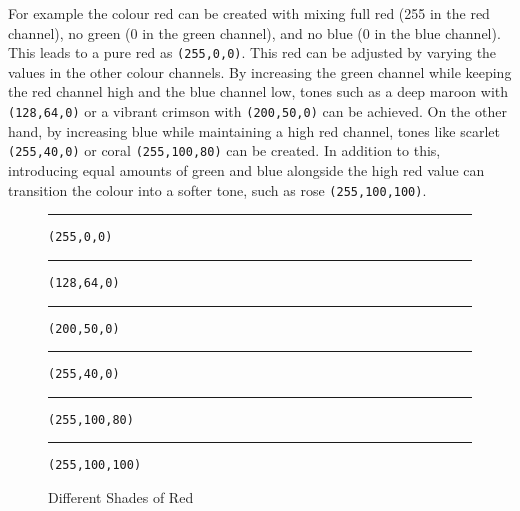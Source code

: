 \documentclass[../MasterThesis.tex]{subfiles}
\begin{document}
For example the colour red can be created with mixing full red (255 in the red channel), no green (0 in the green channel), and no blue (0 in the blue channel). This leads to a pure red as \texttt{(255,0,0)}.
This red can be adjusted by varying the values in the other colour channels. By increasing the green channel while keeping the red channel high and the blue channel low, tones such as a deep maroon with \texttt{(128,64,0)} or a vibrant crimson with \texttt{(200,50,0)} can be achieved. On the other hand, by increasing blue while maintaining a high red channel, tones like scarlet \texttt{(255,40,0)} or coral \texttt{(255,100,80)} can be created. In addition to this, introducing equal amounts of green and blue alongside the high red value can transition the colour into a softer tone, such as rose \texttt{(255,100,100)}.

\begin{figure}[h]
\centering
 \begin{minipage}{\textwidth}
	\centering
	
	\bigskip
	
	\textcolor[RGB]{255,0,0}{\rule{1cm}{1cm}} \texttt{(255,0,0)} \hspace{0.5cm}
	\textcolor[RGB]{128,64,0}{\rule{1cm}{1cm}} \texttt{(128,64,0)} \hspace{0.5cm}
	\textcolor[RGB]{200,50,0}{\rule{1cm}{1cm}} \texttt{(200,50,0)} \hspace{0.5cm}
	\textcolor[RGB]{255,40,0}{\rule{1cm}{1cm}} \texttt{(255,40,0) }\hspace{0.5cm}
	\textcolor[RGB]{255,100,80}{\rule{1cm}{1cm}} \texttt{(255,100,80)} \hspace{0.5cm}
	\textcolor[RGB]{255,100,100}{\rule{1cm}{1cm}} \texttt{(255,100,100)}
\end{minipage}

\caption{Different Shades of Red}
\end{figure}








	
	
	
	
\end{document}
